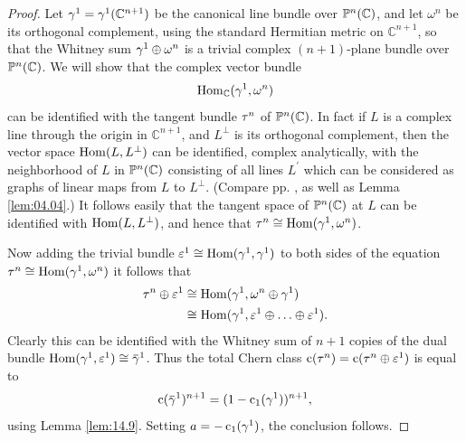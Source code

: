 \documentclass[../main]{subfiles}
\begin{document}
\begin{proof} Let $\gamma^{1}=\gamma^{1}(\mathbb{C}^{n+1})$ be the canonical line bundle over $\mathbb{P}^{n}(\mathbb{C})$, and let $\omega^{n}$ be its orthogonal complement, using the standard Hermitian metric on $\mathbb{C}^{n+1}$, so that the Whitney sum $\gamma^{1} \oplus \omega^{n}$ is a trivial complex $(n+1)$-plane bundle over $\mathbb{P}^{n}(\mathbb{C})$. We will show that the complex vector bundle
\[
\operatorname{Hom}_{\mathbb{C}}(\gamma^{1}, \omega^{n})
\]
can be identified with the tangent bundle $\tau_{}^n$ of $\mathbb{P}^{n}(\mathbb{C})$. In fact if $L$ is a complex line through the origin in $\mathbb{C}^{n+1}$, and $L^{\perp}$ is its orthogonal complement, then the vector space $\operatorname{Hom}(L, L^{\perp})$ can be identified, complex analytically, with the neighborhood of $L$ in $\mathbb{P}^{n}(\mathbb{C})$ consisting of all lines $L^{\prime}$ which can be considered as graphs of linear maps from $L$ to $L^{\perp}$. (Compare pp. \pageref{lem:05.01},\pageref{prob-5-B} as well as Lemma \ref{lem:04.04}.) It follows easily that the tangent space of $\mathbb{P}^{n}(\mathbb{C})$ at $L$ can be identified with $\operatorname{Hom}(L, L^{\perp})$, and hence that $\tau_{}^n \cong \operatorname{Hom}(\gamma^{1}, \omega^{n})$.

Now adding the trivial bundle $\varepsilon^{1} \cong \operatorname{Hom}(\gamma^{1}, \gamma^{1})$ to both sides of the equation $\tau_{}^n \cong \operatorname{Hom}(\gamma^{1}, \omega^{n})$ it follows that
\[
\begin{aligned}
\tau^{n}\oplus \varepsilon^1 & \cong \operatorname{Hom}(\gamma^{1}, \omega^{n} \oplus \gamma^{1}) \\
& \cong \operatorname{Hom}(\gamma^{1}, \varepsilon^{1} \oplus \ldots \oplus \varepsilon^{1}) .
\end{aligned}
\]
Clearly this can be identified with the Whitney sum of $n+1$ copies of the dual bundle $\Hom(\tautological^{1}, \trivialbundle^{1}) \cong \xoverline{\tautological}^{1}$. Thus the total Chern class $\operatorname{c}(\tau_{}^{n})=\operatorname{c}(\tau_{}^n \oplus \varepsilon^{1})$ is equal to
\[
\chernclass(\xoverline{\tautological}^{1})^{n+1}=(1-\chernclass_{1}(\tautological^{1}))^{n+1},
\]
using Lemma \ref{lem:14.9}. Setting $a=-\operatorname{c}_{1}(\gamma^{1})$, the conclusion follows.\end{proof}
\end{document}
